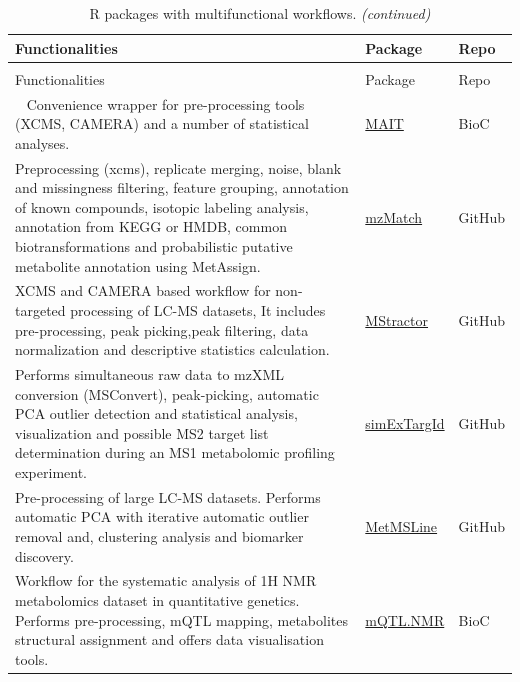 \documentclass[]{article}
\begin{document}
\begin{longtable}[t]{>{\raggedright\arraybackslash}p{30em}>{\raggedright\arraybackslash}p{10em}>{\raggedright\arraybackslash}p{3em}}
\caption{\label{tab:tab9}R packages with multifunctional workflows.}\\
\toprule
Functionalities & Package & Repo\\
\midrule
\endfirsthead
\caption[]{\label{tab:tab9}R packages with multifunctional workflows. \textit{(continued)}}\\
\toprule
Functionalities & Package & Repo\\
\midrule
\endhead
\
\endfoot
\bottomrule
\endlastfoot
\rowcolor{gray!6}  Convenience wrapper for pre-processing tools (XCMS, CAMERA) and a number of statistical analyses. & \href{https://www.bioconductor.org/packages/release/bioc/html/MAIT.html}{MAIT} & BioC\\
Preprocessing (xcms), replicate merging, noise, blank and missingness filtering, feature grouping, annotation of known compounds, isotopic labeling analysis, annotation from KEGG or HMDB, common biotransformations and probabilistic putative metabolite annotation using MetAssign. & \href{https://github.com/andzajan/mzmatch.R}{mzMatch} & GitHub\\
\rowcolor{gray!6}  XCMS and CAMERA based workflow for non-targeted processing of LC-MS datasets, It includes pre-processing, peak picking,peak filtering, data normalization and descriptive statistics calculation. & \href{https://github.com/search?q=MStractor}{MStractor} & GitHub\\
Performs simultaneous raw data to mzXML conversion (MSConvert), peak-picking, automatic PCA outlier detection and statistical analysis, visualization and possible MS2 target list determination during an MS1 metabolomic profiling experiment. & \href{https://github.com/WMBEdmands/simExTargId}{simExTargId} & GitHub\\
\rowcolor{gray!6}  Pre-processing of large LC-MS datasets. Performs automatic PCA with iterative automatic outlier removal and, clustering analysis and biomarker discovery. & \href{https://github.com/WMBEdmands/MetMSLine}{MetMSLine} & GitHub\\
\addlinespace
Workflow for the systematic analysis of 1H NMR metabolomics dataset in quantitative genetics. Performs pre-processing, mQTL mapping, metabolites structural assignment and offers data visualisation tools. & \href{https://www.bioconductor.org/packages/3.5/bioc/html/mQTL.NMR.html}{mQTL.NMR} & BioC\\

\end{longtable}
\end{document}
